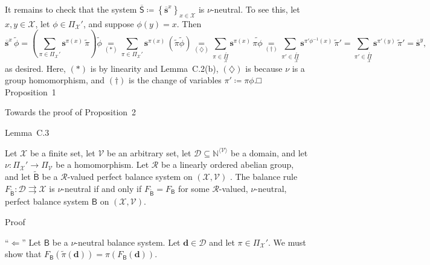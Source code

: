 \documentclass[
]{article}
\begin{document}
It remains to check that the system
\(\overline{\mathsf{S}} ≔ \left\{ {\overline{\mathbf{s}}}^{x} \right\}_{x \in \mathcal{X}}\)
is \(\nu\)-neutral. To see this, let \(x,y \in \mathcal{X}\), let
\(\phi \in \Pi_{\mathcal{X}}'\), and suppose \(\phi(y) = x\). Then
\[{\overline{\mathbf{s}}}^{x}\,\widetilde{\phi} = \left( \sum\limits_{\pi \in \Pi_{\mathcal{X}}'}\mathbf{s}^{\pi{(x)}}\,\widetilde{\pi} \right)\widetilde{\phi}\underset{( \ast )}{=}\sum\limits_{\pi \in \Pi_{\mathcal{X}}'}\mathbf{s}^{\pi{(x)}}\,\left( \widetilde{\pi}\widetilde{\phi} \right)\underset{(\diamondsuit)}{=}\sum\limits_{\pi \in \underset{\mathcal{X}}{\overset{'}{\Pi}}}\mathbf{s}^{\pi{(x)}}\,\widetilde{\pi\phi}\underset{( \dagger )}{=}\sum\limits_{\pi' \in \underset{\mathcal{X}}{\overset{'}{\Pi}}}\mathbf{s}^{\pi'\phi^{- 1}{(x)}}\,{\widetilde{\pi}}' = \sum\limits_{\pi' \in \underset{\mathcal{X}}{\overset{'}{\Pi}}}\mathbf{s}^{\pi'{(y)}}\,{\widetilde{\pi}}' = {\overline{\mathbf{s}}}^{y}\text{,}\]
as desired. Here, \(( \ast )\) is by linearity and Lemma~C.2(b),
\((\diamondsuit)\) is because \(\nu\) is a group homomorphism, and
\(( \dagger )\) is the change of variables \(\pi' ≔ \pi\phi\).□
Proposition~1

\protect{}\label{s000045}
Towards the proof of Proposition~2

Lemma~C.3

Let \(\mathcal{X}\) be a finite set, let \(\mathcal{V}\) be an arbitrary
set, let
\(\mathcal{D} \subseteq \mathbb{N}^{\langle\mathcal{V}\rangle}\) be a
domain, and let
\(\left. \nu:\Pi_{\mathcal{X}}'\longrightarrow\Pi_{\mathcal{V}} \right.\)
be a homomorphism. Let \(\mathcal{R}\) be a linearly ordered abelian
group, and let \(\widetilde{\mathsf{B}}\) be a \(\mathcal{R}\)-valued
perfect balance system on \(\left( \mathcal{X},\mathcal{V} \right)\) .
The balance rule
\(\left. F_{\widetilde{\mathsf{B}}}:\mathcal{D}\rightrightarrows\mathcal{X} \right.\)
is \(\nu\)-neutral if and only if
\(F_{\widetilde{\mathsf{B}}} = F_{\mathsf{B}}\) for some
\(\mathcal{R}\)-valued, \(\nu\)-neutral, perfect balance system
\(\mathsf{B}\) on \(\left( \mathcal{X},\mathcal{V} \right)\).

Proof

``\(\Longleftarrow\)'' Let \(\mathsf{B}\) be a \(\nu\)-neutral balance
system. Let \(\mathbf{d} \in \mathcal{D}\) and let
\(\pi \in \Pi_{\mathcal{X}}'\). We must show that
\(F_{\mathsf{B}}\left( \widetilde{\pi}\left( \mathbf{d} \right) \right) = \pi\left( F_{\mathsf{B}}\left( \mathbf{d} \right) \right)\).
\end{document}
